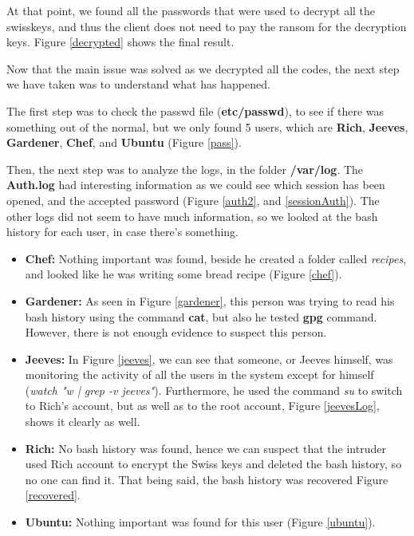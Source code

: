 \documentclass[a4paper,12pt]{article}
\begin{document}
At that point, we found all the passwords that were used to decrypt all the swisskeys, and thus the client does not need to pay the ransom for the decryption keys. Figure \ref{decrypted} shows the final result. 


Now that the main issue was solved as we decrypted all the codes, the next step we have taken was to understand what has happened. 

The first step was to check the passwd file (\textbf{etc/passwd}), to see if there was something out of the normal, but we only found 5 users, which are \textbf{Rich}, \textbf{Jeeves}, \textbf{Gardener}, \textbf{Chef}, and \textbf{Ubuntu} (Figure \ref{pass}). 

Then, the next step was to analyze the logs, in the folder \textbf{/var/log}. The \textbf{Auth.log} had interesting information as we could see which session has been opened, and the accepted password (Figure \ref{auth2}, and \ref{sessionAuth}). The other logs did not seem to have much information, so we looked at the bash history for each user, in case there's something. 

\begin{itemize}
\item \textbf{Chef:} Nothing important was found, beside he created a folder called \textit{recipes}, and looked like he was writing some bread recipe (Figure \ref{chef}).
\item \textbf{Gardener:} As seen in Figure \ref{gardener}, this person was trying to read his bash history using the command \textbf{cat}, but also he tested \textbf{gpg} command. However, there is not enough evidence to suspect this person. 
\item \textbf{Jeeves:} In Figure \ref{jeeves}, we can see that someone, or Jeeves himself, was monitoring the activity of all the users in the system except for himself (\textit{watch "w | grep -v jeeves"}). Furthermore, he used the command \textit{su} to switch to Rich's account, but as well as to the root account, Figure \ref{jeevesLog}, shows it clearly as well. 
\item \textbf{Rich:} No bash history was found, hence we can suspect that the intruder used Rich account to encrypt the Swiss keys and deleted the bash history, so no one can find it. That being said, the bash history was recovered Figure \ref{recovered}.
\item \textbf{Ubuntu:} Nothing important was found for this user (Figure \ref{ubuntu}).
\end{itemize}
\end{document}
